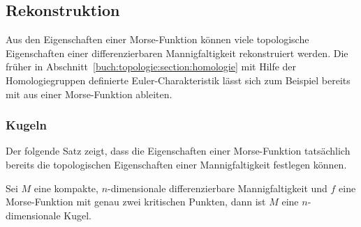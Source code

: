 %
%
\subsection{Rekonstruktion}
Aus den Eigenschaften einer Morse-Funktion können viele topologische
Eigenschaften einer differenzierbaren Mannigfaltigkeit rekonstruiert
werden.
Die früher in Abschnitt~\ref{buch:topologie:section:homologie}
mit Hilfe der Homologiegruppen definierte Euler-Charakteristik
lässt sich zum Beispiel bereits mit aus einer Morse-Funktion
ableiten.

%
%
\subsubsection{Kugeln}
Der folgende Satz zeigt, dass die Eigenschaften einer Morse-Funktion
tatsächlich bereits die topologischen Eigenschaften einer Mannigfaltigkeit
festlegen können.

\begin{satz}
\label{buch:topologie:morse:satz:kugeln}
Sei $M$ eine kompakte, $n$-dimensionale differenzierbare Mannigfaltigkeit
und $f$ eine Morse-Funktion mit genau zwei kritischen Punkten, dann ist
$M$ eine $n$-dimensionale Kugel.
\end{satz}

